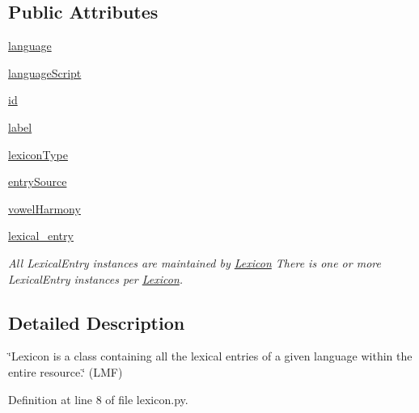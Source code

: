 \subsection*{Public Attributes}
\begin{DoxyCompactItemize}
\item 
\hyperlink{classlmf_1_1src_1_1core_1_1lexicon_1_1_lexicon_a17a5f90d6242843af84f145aea4dfe76}{language}
\item 
\hyperlink{classlmf_1_1src_1_1core_1_1lexicon_1_1_lexicon_a33c93912a6bedb0eb095cf85245d6051}{language\+Script}
\item 
\hyperlink{classlmf_1_1src_1_1core_1_1lexicon_1_1_lexicon_a8d47ac22571af27a1e989c2c7b14e80b}{id}
\item 
\hyperlink{classlmf_1_1src_1_1core_1_1lexicon_1_1_lexicon_a728727809066956b10125e62a954c9c5}{label}
\item 
\hyperlink{classlmf_1_1src_1_1core_1_1lexicon_1_1_lexicon_af434e15172d6aa59954db2a72c9f15f0}{lexicon\+Type}
\item 
\hyperlink{classlmf_1_1src_1_1core_1_1lexicon_1_1_lexicon_a2c62e9663fe3771e684fb4ef94fe1d52}{entry\+Source}
\item 
\hyperlink{classlmf_1_1src_1_1core_1_1lexicon_1_1_lexicon_a0c55ecd82285a7d3dc5d5ebcb1445c25}{vowel\+Harmony}
\item 
\hyperlink{classlmf_1_1src_1_1core_1_1lexicon_1_1_lexicon_a548b2adbf028d9058dd4676cc00d2ee1}{lexical\+\_\+entry}
\begin{DoxyCompactList}\small\item\em All Lexical\+Entry instances are maintained by \hyperlink{classlmf_1_1src_1_1core_1_1lexicon_1_1_lexicon}{Lexicon} There is one or more Lexical\+Entry instances per \hyperlink{classlmf_1_1src_1_1core_1_1lexicon_1_1_lexicon}{Lexicon}. \end{DoxyCompactList}\end{DoxyCompactItemize}


\subsection{Detailed Description}
\char`\"{}\+Lexicon is a class containing all the lexical entries of a given language within the entire resource.\char`\"{} (L\+M\+F) 

Definition at line 8 of file lexicon.\+py.



